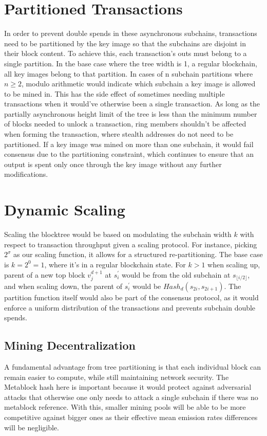 \documentclass{article}
\begin{document}
\section{Partitioned Transactions}
In order to prevent double spends in these asynchronous subchains, transactions need to be partitioned by the key image so that the subchains are disjoint in their block content. To achieve this, each transaction's outs must belong to a single partition. In the base case where the tree width is 1, a regular blockchain, all key images belong to that partition. In cases of n subchain partitions where $n \geq 2$, modulo arithmetic would indicate which subchain a key image is allowed to be mined in. This has the side effect of sometimes needing multiple transactions when it would've otherwise been a single transaction. As long as the partially asynchronous height limit of the tree is less than the minimum number of blocks needed to unlock a transaction, ring members shouldn't be affected when forming the transaction, where stealth addresses do not need to be partitioned. If a key image was mined on more than one subchain, it would fail consensus due to the partitioning constraint, which continues to ensure that an output is spent only once through the key image without any further modifications.
\section{Dynamic Scaling}
Scaling the blocktree would be based on modulating the subchain width $k$ with respect to transaction throughput given a scaling protocol. For instance, picking $2^\sigma$ as our scaling function, it allows for a structured re-partitioning. The base case is $k = 2^0 = 1$, where it's in a regular blockchain state. For $k > 1$ when scaling up, parent of a new top block $v_j^{d+1}$ at $s_i^\prime$ would be from the old subchain at $s_{\lfloor i / 2\rfloor}$, and when scaling down, the parent of $s_i^\prime$ would be $Hash_d(s_{2i}, s_{2i + 1})$. The partition function itself would also be part of the consensus protocol, as it would enforce a uniform distribution of the transactions and prevents subchain double spends.
\subsection{Mining Decentralization}
A fundamental advantage from tree partitioning is that each individual block can remain easier to compute, while still maintaining network security. The Metablock hash here is important because it would protect against adversarial attacks that otherwise one only needs to attack a single subchain if there was no metablock reference. With this, smaller mining pools will be able to be more competitive against bigger ones as their effective mean emission rates differences will be negligible.
\end{document}
